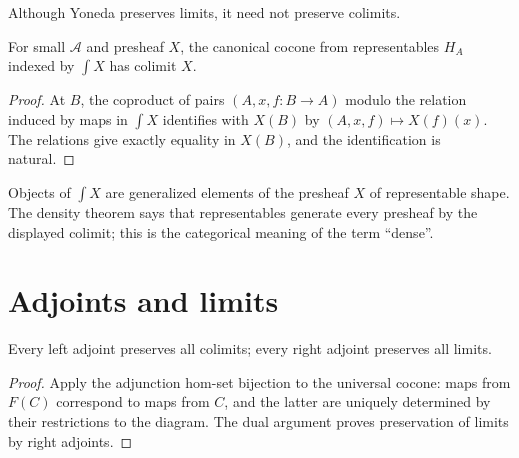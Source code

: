 \begin{warning}
\label{warn:lbc-yoneda-colimits}
Although Yoneda preserves limits, it need not preserve colimits.
\end{warning}

\begin{theorem}[Density]
\label{thm:lbc-density}
For small $\mathcal A$ and presheaf $X$, the canonical cocone from representables
$H_A$ indexed by $\int X$ has colimit $X$.
\end{theorem}
\begin{proof}
At $B$, the coproduct of pairs $(A,x,f:B\to A)$ modulo the relation induced by
maps in $\int X$ identifies with $X(B)$ by $(A,x,f)\mapsto X(f)(x)$. The
relations give exactly equality in $X(B)$, and the identification is natural.
\end{proof}

\begin{remark}
\label{rem:lbc-category-elements-density}
Objects of $\int X$ are generalized elements of the presheaf $X$ of
representable shape. The density theorem says that representables generate
every presheaf by the displayed colimit; this is the categorical meaning of
the term ``dense''.
\end{remark}

\section{Adjoints and limits}
\begin{theorem}
\label{thm:lbc-left-adjoint-colimits}
Every left adjoint preserves all colimits; every right adjoint preserves all
limits.
\end{theorem}
\begin{proof}
Apply the adjunction hom-set bijection to the universal cocone: maps from
$F(C)$ correspond to maps from $C$, and the latter are uniquely determined by
their restrictions to the diagram. The dual argument proves preservation of
limits by right adjoints.
\end{proof}

